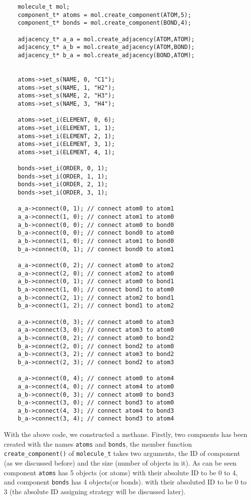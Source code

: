 \documentclass[letterpaper]{book}
\begin{document}
\begin{lstlisting}
    molecule_t mol;
    component_t* atoms = mol.create_component(ATOM,5);
    component_t* bonds = mol.create_component(BOND,4);

    adjacency_t* a_a = mol.create_adjacency(ATOM,ATOM);
    adjacency_t* a_b = mol.create_adjacency(ATOM,BOND);
    adjacency_t* b_a = mol.create_adjacency(BOND,ATOM);


    atoms->set_s(NAME, 0, "C1");
    atoms->set_s(NAME, 1, "H2");
    atoms->set_s(NAME, 2, "H3");
    atoms->set_s(NAME, 3, "H4");

    atoms->set_i(ELEMENT, 0, 6);
    atoms->set_i(ELEMENT, 1, 1);
    atoms->set_i(ELEMENT, 2, 1);
    atoms->set_i(ELEMENT, 3, 1);
    atoms->set_i(ELEMENT, 4, 1);

    bonds->set_i(ORDER, 0, 1);
    bonds->set_i(ORDER, 1, 1);
    bonds->set_i(ORDER, 2, 1);
    bonds->set_i(ORDER, 3, 1);

    a_a->connect(0, 1); // connect atom0 to atom1
    a_a->connect(1, 0); // connect atom1 to atom0
    a_b->connect(0, 0); // connect atom0 to bond0
    b_a->connect(0, 0); // connect bond0 to atom0
    a_b->connect(1, 0); // connect atom1 to bond0
    b_a->connect(0, 1); // connect bond0 to atom1

    a_a->connect(0, 2); // connect atom0 to atom2
    a_a->connect(2, 0); // connect atom2 to atom0
    a_b->connect(0, 1); // connect atom0 to bond1
    b_a->connect(1, 0); // connect bond1 to atom0
    a_b->connect(2, 1); // connect atom2 to bond1
    b_a->connect(1, 2); // connect bond1 to atom2

    a_a->connect(0, 3); // connect atom0 to atom3
    a_a->connect(3, 0); // connect atom3 to atom0
    a_b->connect(0, 2); // connect atom0 to bond2
    b_a->connect(2, 0); // connect bond2 to atom0
    a_b->connect(3, 2); // connect atom3 to bond2
    b_a->connect(2, 3); // connect bond2 to atom3

    a_a->connect(0, 4); // connect atom0 to atom4
    a_a->connect(4, 0); // connect atom4 to atom0
    a_b->connect(0, 3); // connect atom0 to bond3
    b_a->connect(3, 0); // connect bond3 to atom0
    a_b->connect(4, 3); // connect atom4 to bond3
    b_a->connect(3, 4); // connect bond3 to atom4
\end{lstlisting}

With the above code, we constructed a methane. Firstly, two compnents has been created with the 
names \lstinline$atoms$ and \lstinline$bonds$, the member function \lstinline$create_component()$
of \lstinline$molecule_t$ takes two arguments, the ID of component (as we discussed before) and
the size (number of objects in it). As can be seen component \lstinline$atoms$ has 5 objects (or 
atoms) with their absolute ID to be 0 to 4, and component \lstinline $bonds$ has 4 objects(or bonds).
with their absoluted ID to be 0 to 3 (the absolute ID assigning strategy will be discussed later).
   
\end{document}
